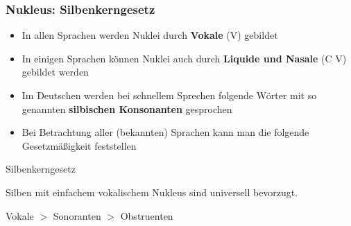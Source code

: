 \begin{frame}
\frametitle{Nukleus: Silbenkerngesetz}

\begin{itemize}

	\item In allen Sprachen werden Nuklei durch \textbf{Vokale} (V) gebildet
	
	\item In einigen Sprachen können Nuklei auch durch \textbf{Liquide und Nasale} (C \ras V) gebildet werden


	
	\item Im Deutschen werden bei schnellem Sprechen folgende Wörter mit so genannten \textbf{silbischen Konsonanten} gesprochen
	
	
          \ea
           \textipa{[le:.z\textsyllabic{n}]} %
          \z
          
          \ea
           
          \z

	\item Bei Betrachtung aller (bekannten) Sprachen kann man die folgende Gesetzmäßigkeit feststellen \citep[cf.][217f.]{Hall00a}

\end{itemize}
	
	\begin{block}{Silbenkerngesetz}
	
	Silben mit einfachem vokalischem Nukleus sind universell bevorzugt.
	
	Vokale $>$ Sonoranten $>$ Obstruenten 
	
	\end{block}
	
\end{frame}




